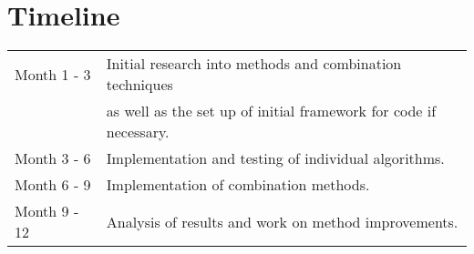 \documentclass{scrartcl}
\begin{document}
    \section{Timeline}
    \begin{table}[H]
    \centering
    \label{my-label}
    \begin{tabular}{ll}
    Month 1 - 3  & Initial research into methods and combination techniques                                                                   \\
                 & as well as the set up of initial framework for code if necessary.                                                          \\
    Month 3 - 6  & Implementation and testing of individual algorithms.                                                                       \\
    Month 6 - 9  & Implementation of combination methods.                                                                                     \\
    Month 9 - 12 & Analysis of results and work on method improvements.                                                                      
    \end{tabular}
    \end{table}

    \printbibliography
\end{document}
